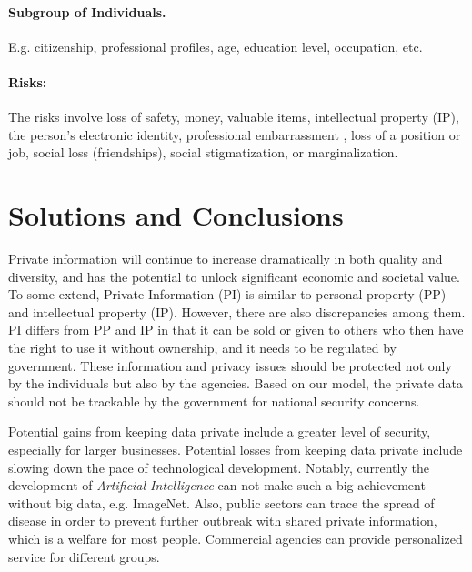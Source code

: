 \documentclass[a4paper,11pt]{texMemo} %
\begin{document}
\paragraph{Subgroup of Individuals.} E.g. citizenship, professional profiles, age, education level, occupation, etc.

\paragraph{Risks:} The risks involve loss of safety, money, valuable items, intellectual property (IP),  the person's electronic identity, professional embarrassment , loss of a position or job, social loss (friendships), social stigmatization, or marginalization.
\section{Solutions and Conclusions}

Private information will continue to increase dramatically in both quality and diversity, and has the potential to unlock significant economic and societal value.
To some extend, Private Information (PI) is similar to personal property (PP) and intellectual property (IP). However, there are also discrepancies among them. PI differs from PP and IP in that it can be sold or given to others who then have the right to use it without ownership, and it needs to be regulated by government. These information and privacy issues should be protected not only by the individuals but also by the agencies. Based on our model, the private data should not be trackable by the government for national security concerns.

Potential gains from keeping data private include a greater level of security, especially for larger businesses. Potential losses from keeping data private include slowing down the pace of technological development. Notably, currently the development of \emph{Artificial Intelligence} can not make such a big achievement without big data, e.g. ImageNet. Also, public sectors can trace the spread of disease in order to prevent further outbreak with shared private information, which is a welfare for most people. Commercial agencies can provide personalized service for different groups.
\end{document}
